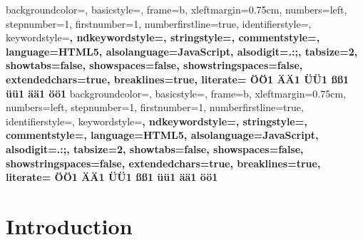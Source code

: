 \documentclass[master,english]{hgbthesis}
\begin{document}
 {%
  backgroundcolor=\color{editorGray},
  basicstyle={\footnotesize\ttfamily},   
  frame=b,
  xleftmargin={0.75cm},
  numbers=left,
  stepnumber=1,
  firstnumber=1,
  numberfirstline=true,	
  identifierstyle=\color{black},
  keywordstyle=\color{blue}\bfseries,
  ndkeywordstyle=\color{editorGreen}\bfseries,
  stringstyle=\color{editorOcher}\ttfamily,
  commentstyle=\color{brown}\ttfamily,
  language=HTML5,
  alsolanguage=JavaScript,
  alsodigit={.:;},	
  tabsize=2,
  showtabs=false,
  showspaces=false,
  showstringspaces=false,
  extendedchars=true,
  breaklines=true,
  literate=%
  {Ö}{{\"O}}1
  {Ä}{{\"A}}1
  {Ü}{{\"U}}1
  {ß}{{\ss}}1
  {ü}{{\"u}}1
  {ä}{{\"a}}1
  {ö}{{\"o}}1
}
 {%
  backgroundcolor=\color{editorGray},
  basicstyle={\footnotesize\ttfamily},   
  frame=b,
  xleftmargin={0.75cm},
  numbers=left,
  stepnumber=1,
  firstnumber=1,
  numberfirstline=true,	
  identifierstyle=\color{black},
  keywordstyle=\color{blue}\bfseries,
  ndkeywordstyle=\color{editorGreen}\bfseries,
  stringstyle=\color{editorOcher}\ttfamily,
  commentstyle=\color{brown}\ttfamily,
  language=HTML5,
  alsolanguage=JavaScript,
  alsodigit={.:;},	
  tabsize=2,
  showtabs=false,
  showspaces=false,
  showstringspaces=false,
  extendedchars=true,
  breaklines=true,
  literate=%
  {Ö}{{\"O}}1
  {Ä}{{\"A}}1
  {Ü}{{\"U}}1
  {ß}{{\ss}}1
  {ü}{{\"u}}1
  {ä}{{\"a}}1
  {ö}{{\"o}}1
}

\mainmatter         %
\chapter{Introduction}
\end{document}
